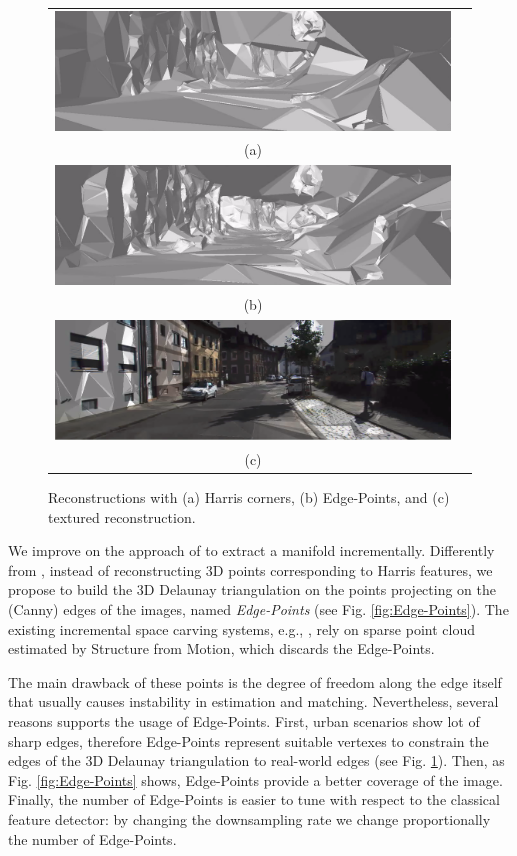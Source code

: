 \begin{figure}
\centering
\begin{tabular}{cc}
\includegraphics[width=0.75\columnwidth]{./img//reconstrHarris}\\
(a)\\
\includegraphics[width=0.75\columnwidth]{./img//reconstr}\\
(b)\\
\includegraphics[width=0.75\columnwidth]{./img//reconstrTex}\\
(c)\\
\end{tabular}
\caption{Reconstructions with (a) Harris corners, (b) Edge-Points, and (c) textured reconstruction.}
\label{fig:recons}
\end{figure}

We improve on the approach of \cite{litvinov_lhuillier_13} to extract a manifold incrementally. 
Differently from \cite{litvinov_lhuillier_13}, instead of reconstructing 3D points corresponding to Harris features, we propose to build the 3D Delaunay triangulation on the points projecting on the (Canny) edges of the images, named \emph{Edge-Points} (see Fig. \ref{fig:Edge-Points}). 
The existing incremental space carving systems, e.g., \cite{litvinov_Lhiuller14, litvinov_lhuillier_13, lovi_et_al_11}, rely on sparse point cloud estimated by Structure from Motion, which discards the Edge-Points.

The main drawback of these points is the degree of freedom along the edge itself that usually causes instability in estimation and matching.
Nevertheless, several reasons supports the usage of Edge-Points.
First, urban scenarios show lot of sharp edges, therefore Edge-Points represent suitable vertexes to constrain the edges of the 3D Delaunay triangulation to real-world edges (see Fig. \ref{fig:recons}). 
Then, as Fig. \ref{fig:Edge-Points} shows, Edge-Points provide a better coverage of the image.
Finally, the number of Edge-Points is easier to tune with respect to the classical feature detector: by changing the downsampling rate we change proportionally the number of Edge-Points.

